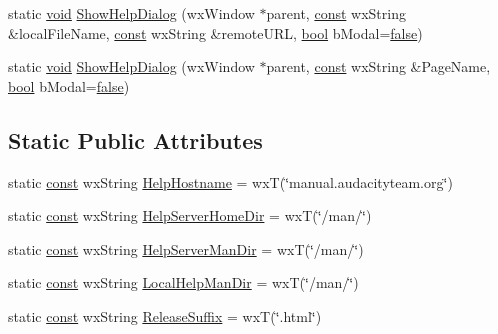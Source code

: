 \begin{DoxyCompactItemize}
\item 
static \hyperlink{sound_8c_ae35f5844602719cf66324f4de2a658b3}{void} \hyperlink{class_help_system_afd91f18e312cfd4949ab7d2b07ad5f19}{Show\+Help\+Dialog} (wx\+Window $\ast$parent, \hyperlink{getopt1_8c_a2c212835823e3c54a8ab6d95c652660e}{const} wx\+String \&local\+File\+Name, \hyperlink{getopt1_8c_a2c212835823e3c54a8ab6d95c652660e}{const} wx\+String \&remote\+U\+RL, \hyperlink{mac_2config_2i386_2lib-src_2libsoxr_2soxr-config_8h_abb452686968e48b67397da5f97445f5b}{bool} b\+Modal=\hyperlink{mac_2config_2i386_2lib-src_2libsoxr_2soxr-config_8h_a65e9886d74aaee76545e83dd09011727}{false})
\item 
static \hyperlink{sound_8c_ae35f5844602719cf66324f4de2a658b3}{void} \hyperlink{class_help_system_a05660734736c49ca82089b5b92643c60}{Show\+Help\+Dialog} (wx\+Window $\ast$parent, \hyperlink{getopt1_8c_a2c212835823e3c54a8ab6d95c652660e}{const} wx\+String \&Page\+Name, \hyperlink{mac_2config_2i386_2lib-src_2libsoxr_2soxr-config_8h_abb452686968e48b67397da5f97445f5b}{bool} b\+Modal=\hyperlink{mac_2config_2i386_2lib-src_2libsoxr_2soxr-config_8h_a65e9886d74aaee76545e83dd09011727}{false})
\end{DoxyCompactItemize}
\subsection*{Static Public Attributes}
\begin{DoxyCompactItemize}
\item 
static \hyperlink{getopt1_8c_a2c212835823e3c54a8ab6d95c652660e}{const} wx\+String \hyperlink{class_help_system_a97d0ea755aba82e416e1e7bb92c0a661}{Help\+Hostname} = wxT(\char`\"{}manual.\+audacityteam.\+org\char`\"{})
\item 
static \hyperlink{getopt1_8c_a2c212835823e3c54a8ab6d95c652660e}{const} wx\+String \hyperlink{class_help_system_aa34b17b9fd1cc79ebd0d653c66b50c40}{Help\+Server\+Home\+Dir} = wxT(\char`\"{}/man/\char`\"{})
\item 
static \hyperlink{getopt1_8c_a2c212835823e3c54a8ab6d95c652660e}{const} wx\+String \hyperlink{class_help_system_aa40a1344319637d1d4085329eb6c92e3}{Help\+Server\+Man\+Dir} = wxT(\char`\"{}/man/\char`\"{})
\item 
static \hyperlink{getopt1_8c_a2c212835823e3c54a8ab6d95c652660e}{const} wx\+String \hyperlink{class_help_system_a5c232da2ddf467e10a4127b03fbf2e7a}{Local\+Help\+Man\+Dir} = wxT(\char`\"{}/man/\char`\"{})
\item 
static \hyperlink{getopt1_8c_a2c212835823e3c54a8ab6d95c652660e}{const} wx\+String \hyperlink{class_help_system_a853fee51c51bab195800baeb3f7d406e}{Release\+Suffix} = wxT(\char`\"{}.html\char`\"{})
\end{DoxyCompactItemize}


